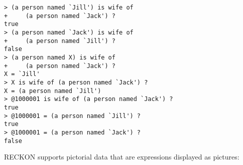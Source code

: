 \documentclass[12pt]{article}
\newenvironment{indpar}[1][0.3in]%
	{\begin{list}{}%
		     {\setlength{\itemsep}{0in}%
		      \setlength{\topsep}{0in}%
		      \setlength{\parsep}{1ex}%
		      \setlength{\labelwidth}{#1}%
		      \setlength{\leftmargin}{#1}%
		      \addtolength{\leftmargin}{\labelsep}}%
	 \item}%
	{\end{list}}
\begin{document}
\begin{indpar}
\verb|> (a person named `Jill') is wife of| \\
\verb|+     (a person named `Jack') ?| \\
\verb|true| \\
\verb|> (a person named `Jack') is wife of| \\
\verb|+     (a person named `Jill') ?| \\
\verb|false| \\
\verb|> (a person named X) is wife of| \\
\verb|+     (a person named `Jack') ?| \\
\verb|X = `Jill'| \\
\verb|> X is wife of (a person named `Jack') ?| \\
\verb|X = (a person named `Jill')| \\
\verb|> @1000001 is wife of (a person named `Jack') ?| \\
\verb|true| \\
\verb|> @1000001 = (a person named `Jill') ?| \\
\verb|true| \\
\verb|> @1000001 = (a person named `Jack') ?| \\
\verb|false|
\end{indpar}

RECKON supports pictorial data
that are expressions displayed as pictures:
\end{document}
